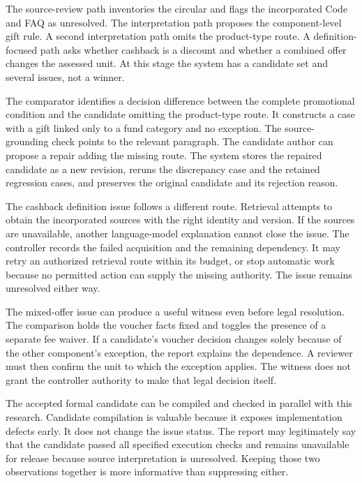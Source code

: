 The source-review path inventories the circular and flags the incorporated Code
and FAQ as unresolved. The interpretation path proposes the component-level
gift rule. A second interpretation path omits the product-type route. A
definition-focused path asks whether cashback is a discount and whether a
combined offer changes the assessed unit. At this stage the system has a
candidate set and several issues, not a winner.

The comparator identifies a decision difference between the complete promotional
condition and the candidate omitting the product-type route. It constructs a
case with a gift linked only to a fund category and no exception. The
source-grounding check points to the relevant paragraph. The candidate author
can propose a repair adding the missing route. The system stores the repaired
candidate as a new revision, reruns the discrepancy case and the retained
regression cases, and preserves the original candidate and its rejection reason.

The cashback definition issue follows a different route. Retrieval attempts to
obtain the incorporated sources with the right identity and version. If the
sources are unavailable, another language-model explanation cannot close the
issue. The controller records the failed acquisition and the remaining
dependency. It may retry an authorized retrieval route within its budget, or
stop automatic work because no permitted action can supply the missing
authority. The issue remains unresolved either way.


The mixed-offer issue can produce a useful witness even before legal resolution.
The comparison holds the voucher facts fixed and toggles the presence of a
separate fee waiver. If a candidate's voucher decision changes solely because
of the other component's exception, the report explains the dependence. A
reviewer must then confirm the unit to which the exception applies. The witness
does not grant the controller authority to make that legal decision itself.

The accepted formal candidate can be compiled and checked in parallel with this
research. Candidate compilation is valuable because it exposes implementation
defects early. It does not change the issue status. The report may legitimately
say that the candidate passed all specified execution checks and remains
unavailable for release because source interpretation is unresolved. Keeping
those two observations together is more informative than suppressing either.

